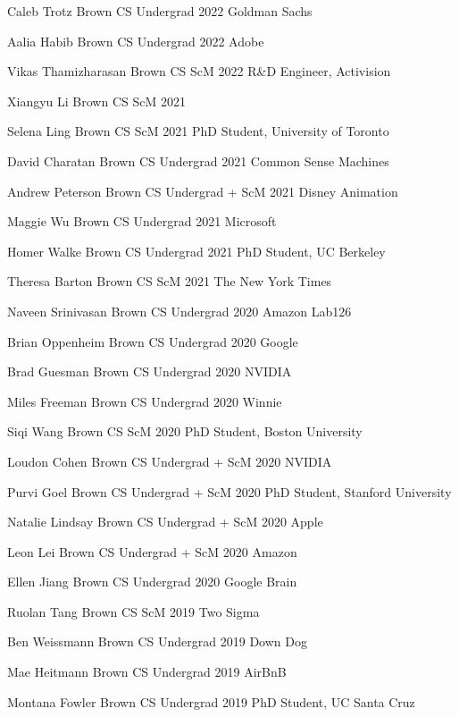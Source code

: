 \documentclass[line,margin]{res}
\begin{document}
\begin{resume}
\alumni
{Caleb Trotz}
{Brown CS Undergrad}
{2022}
{Goldman Sachs}

\alumni
{Aalia Habib}
{Brown CS Undergrad}
{2022}
{Adobe}

\alumni
{Vikas Thamizharasan}
{Brown CS ScM}
{2022}
{R\&D Engineer, Activision}

\alumni
{Xiangyu Li}
{Brown CS ScM}
{2021}
{}

\alumni
{Selena Ling}
{Brown CS ScM}
{2021}
{PhD Student, University of Toronto}

\alumni
{David Charatan}
{Brown CS Undergrad}
{2021}
{Common Sense Machines}

\alumni
{Andrew Peterson}
{Brown CS Undergrad + ScM}
{2021}
{Disney Animation}

\alumni
{Maggie Wu}
{Brown CS Undergrad}
{2021}
{Microsoft}

\alumni
{Homer Walke}
{Brown CS Undergrad}
{2021}
{PhD Student, UC Berkeley}

\alumni
{Theresa Barton}
{Brown CS ScM}
{2021}
{The New York Times}

\alumni
{Naveen Srinivasan}
{Brown CS Undergrad}
{2020}
{Amazon Lab126}

\alumni
{Brian Oppenheim}
{Brown CS Undergrad}
{2020}
{Google}

\alumni
{Brad Guesman}
{Brown CS Undergrad}
{2020}
{NVIDIA}

\alumni
{Miles Freeman}
{Brown CS Undergrad}
{2020}
{Winnie}

\alumni
{Siqi Wang}
{Brown CS ScM}
{2020}
{PhD Student, Boston University}

\alumni
{Loudon Cohen}
{Brown CS Undergrad + ScM}
{2020}
{NVIDIA}

\alumni
{Purvi Goel}
{Brown CS Undergrad + ScM}
{2020}
{PhD Student, Stanford University}

\alumni
{Natalie Lindsay}
{Brown CS Undergrad + ScM}
{2020}
{Apple}

\alumni
{Leon Lei}
{Brown CS Undergrad + ScM}
{2020}
{Amazon}

\alumni
{Ellen Jiang}
{Brown CS Undergrad}
{2020}
{Google Brain}

\alumni
{Ruolan Tang}
{Brown CS ScM}
{2019}
{Two Sigma}

\alumni
{Ben Weissmann}
{Brown CS Undergrad}
{2019}
{Down Dog}

\alumni
{Mae Heitmann}
{Brown CS Undergrad}
{2019}
{AirBnB}

\alumni
{Montana Fowler}
{Brown CS Undergrad}
{2019}
{PhD Student, UC Santa Cruz}


\end{resume}
\end{document}

